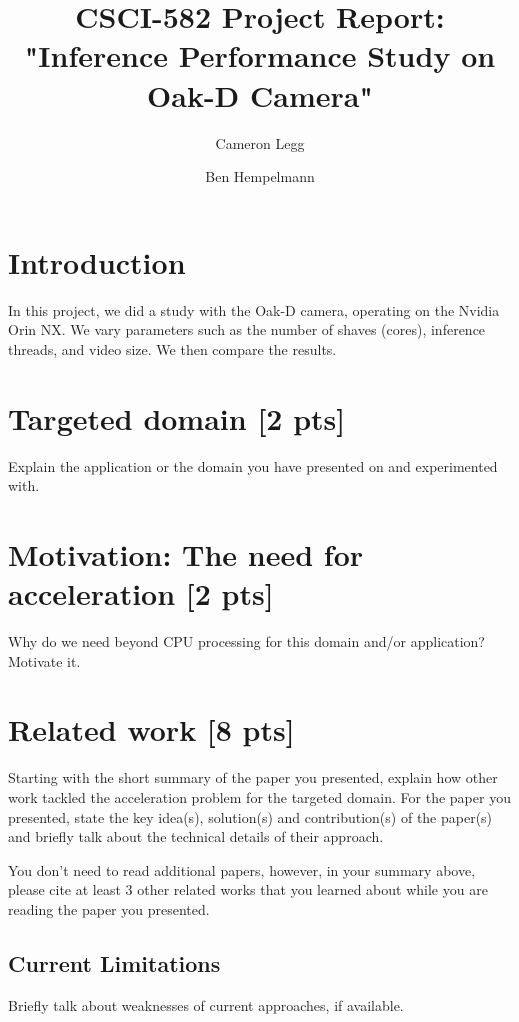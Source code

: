 \documentclass[sigconf,authorversion,nonacm]{acmart}
\begin{document}
\title{CSCI-582 Project Report: "Inference Performance Study on Oak-D Camera"}

\author{Cameron Legg}

\author{Ben Hempelmann}

\maketitle

\section{Introduction}
In this project, we did a study with the Oak-D camera, operating on the Nvidia Orin NX. We vary parameters such as the number of shaves (cores), inference threads, and video size. We then compare the results.

\section{Targeted domain {\small [2 pts]}}
Explain the application or the domain you have presented on and experimented with. 

\section{Motivation: The need for acceleration {\small {[2 pts]}}}

Why do we need beyond CPU processing for this domain and/or application? Motivate it.

\section{Related work {\small {[8 pts]}}}
Starting with the short summary of the paper you presented, explain how other work tackled the acceleration problem for the targeted domain. For the paper you presented, state the key idea(s), solution(s) and contribution(s) of the paper(s) and briefly talk about the technical details of their approach.

You don't need to read additional papers, however, in your summary above, please cite at least 3 other related works that you learned about while you are reading the paper you presented. 

\subsection{Current Limitations}
Briefly talk about weaknesses of current approaches, if available. 
\end{document}
